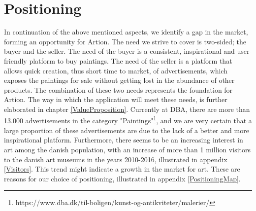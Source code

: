 \section{Positioning}
In continuation of the above mentioned aspects, we identify a gap in the market, forming an opportunity for Artion. The need we strive to cover is two-sided; the buyer and the seller. The need of the buyer is a consistent, inspirational and user-friendly platform to buy paintings. The need of the seller is a platform that allows quick creation, thus short time to market, of advertisements, which exposes the paintings for sale without getting lost in the abundance of other products. The combination of these two needs represents the foundation for Artion. The way in which the application will meet these needs, is further elaborated in chapter \ref{ValueProposition}. Currently at DBA, there are more than 13.000 advertisements in the category "Paintings"\footnote{https://www.dba.dk/til-boligen/kunst-og-antikviteter/malerier/}, and we are very certain that a large proportion of these advertisements are due to the lack of a better and more inspirational platform. Furthermore, there seems to be an increasing interest in art among the danish population, with an increase of more than 1 million visitors to the danish art museums in the years 2010-2016, illustrated in appendix \ref{Visitors}. This trend might indicate a growth in the market for art. These are reasons for our choice of positioning, illustrated in appendix \ref{PositioningMap}.